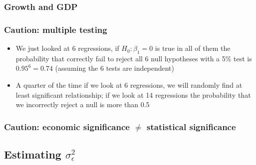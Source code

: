 \begin{frame}\frametitle{Growth and GDP}

  

\end{frame}

\begin{frame}\frametitle{Caution: multiple testing}
  \begin{itemize}
  \item We just looked at 6 regressions, if $H_0: \beta_1 = 0$ is true
    in all of them the probability that correctly fail to reject all 6
    null hypotheses with a 5\% test is $0.95^6 = 0.74$ (assuming the 6
    tests are independent)
  \item A quarter of the time if we look at 6 regressions, we will
    randomly find at least significant relationship; if we look at 14
    regressions the probability that we incorrectly reject a null is
    more than 0.5
  \end{itemize}
\end{frame}

\begin{frame}\frametitle{Caution: economic significance $\neq$
    statistical significance} 
\end{frame}
\subsection{Estimating $\sigma_\epsilon^2$}

